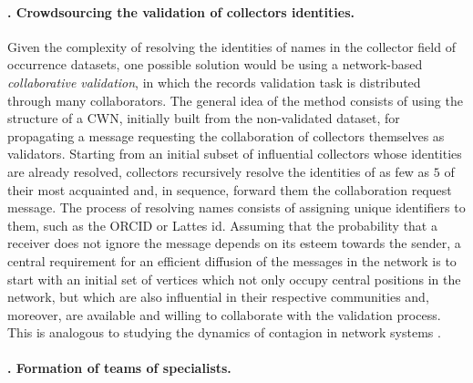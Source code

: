 \paragraph*{\theApplicationCase. Crowdsourcing the validation of collectors identities.}
Given the complexity of resolving the identities of names in the collector field of occurrence datasets, one possible solution would be using a network-based \textit{collaborative validation}, in which the records validation task is distributed through many collaborators.
The general idea of the method consists of using the structure of a CWN, initially built from the non-validated dataset, for propagating a message requesting the collaboration of collectors themselves as validators.
Starting from an initial subset of influential collectors whose identities are already resolved, collectors recursively resolve the identities of as few as $5$ of their most acquainted and, in sequence, forward them the collaboration request message. %
The process of resolving names consists of assigning unique identifiers to them, such as the ORCID or Lattes id.
Assuming that the probability that a receiver does not ignore the message depends on its esteem towards the sender, a central requirement for an efficient diffusion of the messages in the network is to start with an initial set of vertices which not only occupy central positions in the network, but which are also influential in their respective communities and, moreover, are available and willing to collaborate with the validation process.
This is analogous to studying the dynamics of contagion in network systems \cite{Gibson2005}.




\paragraph*{\theApplicationCase. Formation of teams of specialists.}

